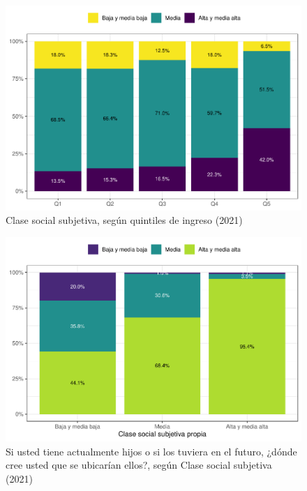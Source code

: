 \documentclass[
  12pt,
  openany]{book}
\begin{document}
\begin{figure}

{\centering \includegraphics{reporte-elsoc_files/figure-latex/ess-quintil-1} 

}

\caption{Clase social subjetiva, según quintiles de ingreso (2021)}\label{fig:ess-quintil}
\end{figure}

\begin{figure}

{\centering \includegraphics{reporte-elsoc_files/figure-latex/esshijos-ess-1} 

}

\caption{Si usted tiene actualmente hijos o si los tuviera en el futuro, ¿dónde cree usted que se ubicarían ellos?, según Clase social subjetiva (2021)}\label{fig:esshijos-ess}
\end{figure}
\end{document}
